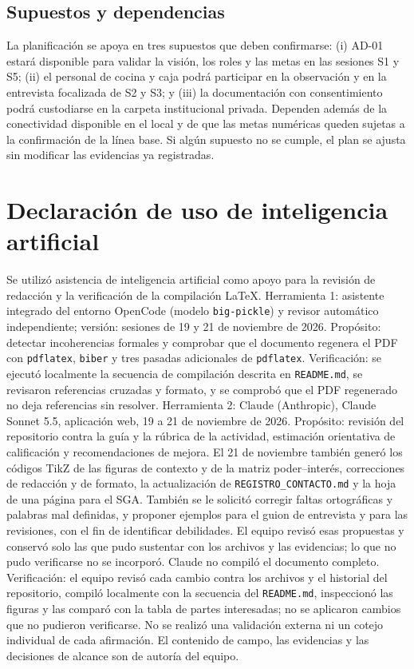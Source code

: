 \subsection{Supuestos y dependencias}
La planificaci\'on se apoya en tres supuestos que deben confirmarse: (i) AD-01 estar\'a disponible para validar la visi\'on, los roles y las metas en las sesiones S1 y S5; (ii) el personal de cocina y caja podr\'a participar en la observaci\'on y en la entrevista focalizada de S2 y S3; y (iii) la documentaci\'on con consentimiento podr\'a custodiarse en la carpeta institucional privada. Dependen adem\'as de la conectividad disponible en el local y de que las metas num\'ericas queden sujetas a la confirmaci\'on de la l\'inea base. Si alg\'un supuesto no se cumple, el plan se ajusta sin modificar las evidencias ya registradas.

\section{Declaraci\'on de uso de inteligencia artificial}
{\small
Se utiliz\'o asistencia de inteligencia artificial como apoyo para la revisi\'on de redacci\'on y la verificaci\'on de la compilaci\'on \LaTeX{}. Herramienta 1: asistente integrado del entorno OpenCode (modelo \texttt{big-pickle}) y revisor autom\'atico independiente; versi\'on: sesiones de 19 y 21 de noviembre de 2026. Prop\'osito: detectar incoherencias formales y comprobar que el documento regenera el PDF con \texttt{pdflatex}, \texttt{biber} y tres pasadas adicionales de \texttt{pdflatex}. Verificaci\'on: se ejecut\'o localmente la secuencia de compilaci\'on descrita en \texttt{README.md}, se revisaron referencias cruzadas y formato, y se comprob\'o que el PDF regenerado no deja referencias sin resolver. Herramienta 2: Claude (Anthropic), Claude Sonnet 5.5, aplicaci\'on web, 19 a 21 de noviembre de 2026. Prop\'osito: revisi\'on del repositorio contra la gu\'ia y la r\'ubrica de la actividad, estimaci\'on orientativa de calificaci\'on y recomendaciones de mejora. El 21 de noviembre tambi\'en gener\'o los c\'odigos TikZ de las figuras de contexto y de la matriz poder--inter\'es, correcciones de redacci\'on y de formato, la actualizaci\'on de \texttt{REGISTRO\_CONTACTO.md} y la hoja de una p\'agina para el SGA. Tambi\'en se le solicit\'o corregir faltas ortogr\'aficas y palabras mal definidas, y proponer ejemplos para el guion de entrevista y para las revisiones, con el fin de identificar debilidades. El equipo revis\'o esas propuestas y conserv\'o solo las que pudo sustentar con los archivos y las evidencias; lo que no pudo verificarse no se incorpor\'o. Claude no compil\'o el documento completo. Verificaci\'on: el equipo revis\'o cada cambio contra los archivos y el historial del repositorio, compil\'o localmente con la secuencia del \texttt{README.md}, inspeccion\'o las figuras y las compar\'o con la tabla de partes interesadas; no se aplicaron cambios que no pudieron verificarse. No se realiz\'o una validaci\'on externa ni un cotejo individual de cada afirmaci\'on. El contenido de campo, las evidencias y las decisiones de alcance son de autor\'ia del equipo.\par}

